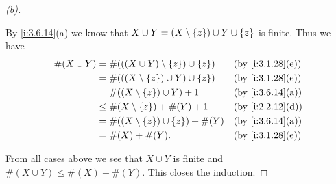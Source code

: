 \begin{proof}[(b)]
\begin{itemize}
          By \cref{i:3.6.14}(a) we know that \(X \cup Y = (X \setminus \left\lbrace z\right\rbrace) \cup Y \cup \left\lbrace z\right\rbrace\) is finite.
          Thus we have
          \begin{align*}
            \#(X \cup Y) & = \#(((X \cup Y) \setminus \set{z}) \cup \set{z}) &  & \by{i:3.1.28}[e] \\
                         & = \#(((X \setminus \set{z}) \cup Y) \cup \set{z}) &  & \by{i:3.1.28}[e] \\
                         & = \#((X \setminus \set{z}) \cup Y) + 1            &  & \by{i:3.6.14}[a] \\
                         & \leq \#(X \setminus \set{z}) + \#(Y) + 1          &  & \by{i:2.2.12}[d] \\
                         & = \#((X \setminus \set{z}) \cup \set{z}) + \#(Y)  &  & \by{i:3.6.14}[a] \\
                         & = \#(X) + \#(Y).                                  &  & \by{i:3.1.28}[e]
          \end{align*}
  \end{itemize}
  From all cases above we see that \(X \cup Y\) is finite and \(\#(X \cup Y) \leq \#(X) + \#(Y)\).
  This closes the induction.


\end{proof}
